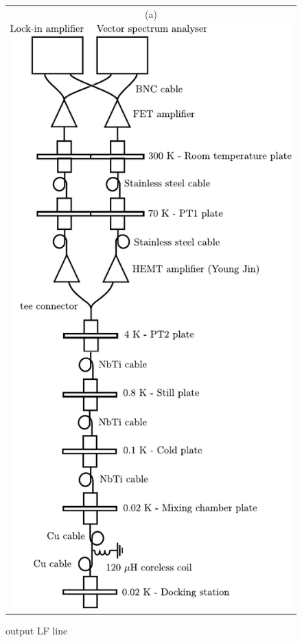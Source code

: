 \begin{figure}[hptb]
	\begin{center}
		\begin{tabular}{c}
			(a) \\ 
			
			\includegraphics[height = 12 cm]{./appB/output_LF_line}
		\end{tabular}
	\end{center}
	
	\caption{output LF line}
	\label{fig: output LF line}
\end{figure}

